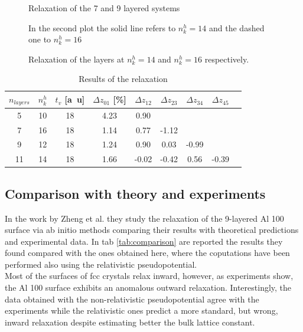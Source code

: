 \documentclass[a4paper, 11pt]{article}
\begin{document}
    \begin{figure}
      \centering
      \caption{Relaxation of the 7 and 9 layered systems}
      \label{fig:nl7-9r}
    \end{figure}

    \begin{figure}
      \centering
      \caption{In the second plot the solid line refers to $n_k^h = 14$ and the dashed one to $n_k^h = 16$}
      \label{fig:nl11}
    \end{figure}

    \begin{figure}
      \centering
      \caption{Relaxation of the layers at $n_k^h = 14$ and $n_k^h = 16$ respectively.}
      \label{fig:nl11r}
    \end{figure}

    \begin{table}[H]
      \centering
      \begin{tabular}{ccccccccc}
        \toprule
        $n_{layers}$ & $n_k^h$ & $t_v$ [\si{a.u}] & $\Delta z_{01}$ [\%] & $\Delta z_{12}$ & $\Delta z_{23}$ & $\Delta z_{34}$ & $\Delta z_{45}$ \\
        \midrule
        5  & 10 & 18 & 4.23 & 0.90 & & & \\
        7  & 16 & 18 & 1.14 & 0.77 & -1.12 & & \\
        9  & 12 & 18 & 1.24 & 0.90 & 0.03 & -0.99 & \\
        11 & 14 & 18 & 1.66 & -0.02 & -0.42 & 0.56 & -0.39 \\
        \bottomrule
      \end{tabular}
      \caption{Results of the relaxation}
      \label{tab:surface_results}
    \end{table}


  \subsection{Comparison with theory and experiments}
    In the work by Zheng et al. \cite{rif:Al_relaxations} they study the relaxation of the 9-layered Al 100 surface via ab initio methods comparing their results with theoretical predictions and experimental data. In tab \ref{tab:comparison} are reported the results they found compared with the ones obtained here, where the coputations have been performed also using the relativistic pseudopotential.\\
    Most of the surfaces of fcc crystals relax inward, however, as experiments show, the Al 100 surface exhibits an anomalous outward relaxation.
    Interestingly, the data obtained with the non-relativistic pseudopotential agree with the experiments while the relativistic ones predict a more standard, but wrong, inward relaxation despite estimating better the bulk lattice constant.
\end{document}
